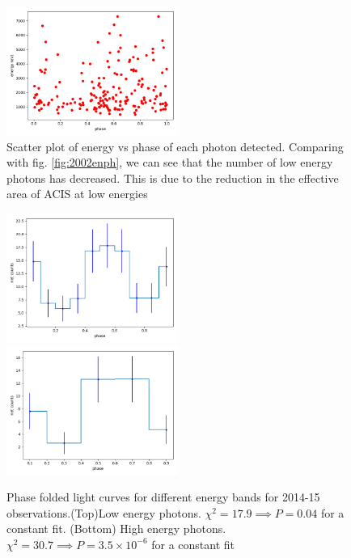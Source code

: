\documentclass[a4paper,fleqn,usenatbib]{mnras}
\begin{document}
\begin{figure}
\centering
\includegraphics[width=0.5\textwidth]{Figures/2015_enph.png}
\caption{Scatter plot of energy vs phase of each photon detected. Comparing with fig. \ref{fig:2002enph}, we can see that the number of low energy photons has decreased. This is due to the reduction in the effective area of ACIS at low energies}
\label{fig:2015enph}
\end{figure}

\begin{figure}
 \centering
 \includegraphics[width=0.5\textwidth]{Figures/2015_1low.png}
 \includegraphics[width=0.5\textwidth]{Figures/2015_1vlow.png}
 \caption{Phase folded light curves for different energy bands for 2014-15 observations.(Top)Low energy photons. $\chi^2 = 17.9 \implies
 P = 0.04$ for a constant fit. (Bottom) High energy photons.
 $\chi^2 = 30.7 \implies P = 3.5 \times 10^{-6}$ for a constant fit}
 \label{fig:2015_low_high}
\end{figure}
\end{document}
